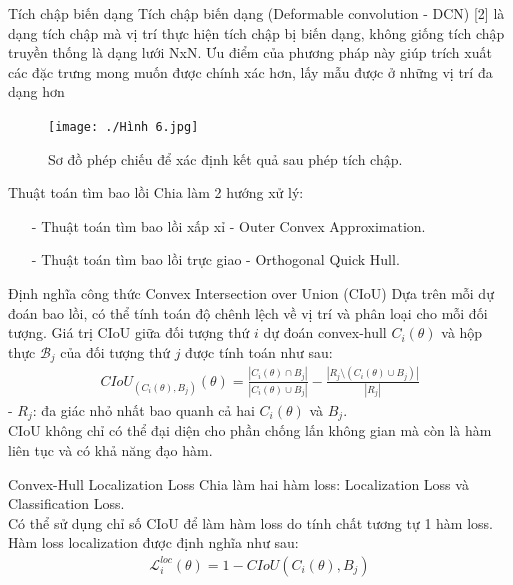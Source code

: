 \documentclass[11pt]{beamer}
\theoremstyle{definition}
\theoremstyle{plain}
\theoremstyle{plain}
\theoremstyle{remark}
\begin{document}
\begin{frame}{Tích chập biến dạng}
Tích chập biến dạng (Deformable convolution - DCN) [2] là dạng tích chập
mà vị trí thực hiện tích chập bị biến dạng, không giống tích chập truyền thống
là dạng lưới NxN. Ưu điểm của phương pháp này giúp trích xuất các đặc trưng
mong muốn được chính xác hơn, lấy mẫu được ở những vị trí đa dạng hơn 

\begin{figure}[ht!]
	\begin{center}
		\texttt{[image: ./Hình 6.jpg]}
		\caption{Sơ đồ phép chiếu để xác định kết quả sau phép tích chập.}
		\label{fig_dhandang6 }
	\end{center}
\end{figure}

\end{frame}


\begin{frame}{Thuật toán tìm bao lồi}
Chia làm 2 hướng xử lý:
\begin{itemize}
	\item[-] Thuật toán tìm bao lồi xấp xỉ - Outer Convex Approximation.
	
	\item[-]  Thuật toán tìm bao lồi trực giao - Orthogonal Quick Hull.
	
\end{itemize}	
\end{frame}

\begin{frame}{Định nghĩa công thức Convex Intersection over Union (CIoU)}
Dựa trên mỗi dự đoán bao lồi, có thể tính toán độ chênh lệch về vị trí và phân loại cho mỗi đối tượng. Giá trị CIoU giữa đối tượng thứ $i$ dự đoán convex-hull $C_i (\theta)$ và hộp thực $\mathcal{B}_j$ của đối tượng thứ $j$ được tính toán như sau:
\begin{align} \label{ptdd}
	CIoU_{(C_i (\theta), B_j)} (\theta) = \frac{|C_i(\theta) \cap B_j|}{|C_i(\theta) \cup B_j|} - \frac{|R_j \setminus (C_i(\theta) \cup B_j)|}{|R_j|}
\end{align}
- $R_j$: đa giác nhỏ nhất bao quanh cả hai $C_i(\theta)$ và $B_j$.\\
CIoU không chỉ có thể đại diện cho phần chống lấn không gian mà còn là hàm liên tục và có khả năng đạo hàm.
\end{frame}


\begin{frame}{Convex-Hull Localization Loss}
Chia làm hai hàm loss: Localization Loss và Classification Loss.\\
 Có thể sử dụng chỉ số CIoU để làm hàm loss do tính chất tương tự 1 hàm loss.\\
 Hàm loss localization được định nghĩa như sau:
\begin{align} \label{ptdd0}
	\mathcal{L}_i^{loc} (\theta) = 1 - CIoU(C_i(\theta), B_j)
\end{align}

\end{frame}
\end{document}
